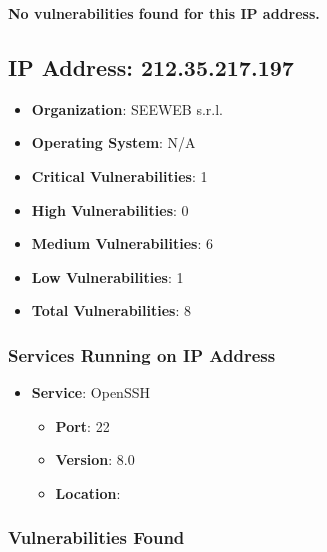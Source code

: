 \documentclass{article}
\begin{document}
\textbf{No vulnerabilities found for this IP address.}




\clearpage



\subsection{IP Address: 212.35.217.197}

\begin{itemize}
    \item \textbf{Organization}: SEEWEB s.r.l.
    \item \textbf{Operating System}:  N/A 
    \item \textbf{Critical Vulnerabilities}: 1
    \item \textbf{High Vulnerabilities}: 0
    \item \textbf{Medium Vulnerabilities}: 6
    \item \textbf{Low Vulnerabilities}: 1
    \item \textbf{Total Vulnerabilities}: 8
\end{itemize}

\subsubsection*{Services Running on IP Address}

\begin{itemize}
    
        \item \textbf{Service}: OpenSSH
        \begin{itemize}
            \item \textbf{Port}: 22
            \item \textbf{Version}:  8.0 
            \item \textbf{Location}: \href{  }{  }
        \end{itemize}
    
\end{itemize}


\subsubsection*{Vulnerabilities Found}
\end{document}
